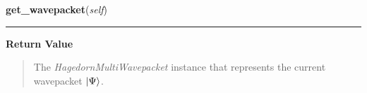     \label{HagedornMultiPropagator:HagedornMultiPropagator:get_wavepacket}

    \vspace{0.5ex}

\hspace{.8\funcindent}\begin{boxedminipage}{\funcwidth}

    \raggedright \textbf{get\_wavepacket}(\textit{self})

    \vspace{-1.5ex}

    \rule{\textwidth}{0.5\fboxrule}
\setlength{\parskip}{2ex}
\setlength{\parskip}{1ex}
      \textbf{Return Value}
    \vspace{-1ex}

      \begin{quote}
      The \textit{HagedornMultiWavepacket} instance that represents the
      current wavepacket $\Ket{\Psi}$.

      \end{quote}

    \end{boxedminipage}

    \vspace{0.5ex}

